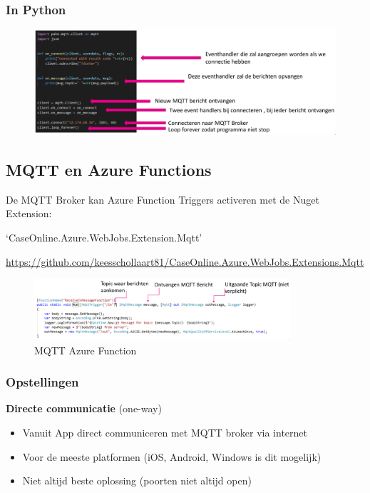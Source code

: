 \documentclass{article}
\newcommand{\bold}[1]{\textbf{#1}}
\begin{document}
\subsubsection{In Python}

\begin{figure}[H]
    \centering
    \includegraphics[width=\textwidth]{mqtt-python.png}
    \caption{}
\end{figure}

\subsection{MQTT en Azure Functions}

De MQTT Broker kan Azure Function Triggers activeren met de Nuget Extension:

`CaseOnline.Azure.WebJobs.Extension.Mqtt'

\url{https://github.com/keesschollaart81/CaseOnline.Azure.WebJobs.Extensions.Mqtt}

\begin{figure}[H]
    \centering
    \includegraphics[width=0.85\textwidth]{mqtt-azurefunction.png}
    \caption{MQTT Azure Function}
\end{figure}

\subsubsection{Opstellingen}

\bold{Directe communicatie} (one-way)

\begin{itemize}
    \item Vanuit App direct communiceren met MQTT broker via internet
    \item Voor de meeste platformen (iOS, Android, Windows is dit mogelijk)
    \item Niet altijd beste oplossing (poorten niet altijd open)
\end{itemize}
\end{document}
